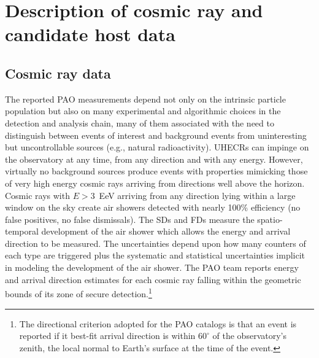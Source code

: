 \section{Description of cosmic ray and candidate host data}

\subsection{Cosmic ray data}
\label{sec:data}

The reported PAO measurements depend not only on the intrinsic particle
population but also on many experimental and algorithmic choices in the
detection and analysis chain, many of them associated with the need to
distinguish between events of interest and background events from uninteresting
but uncontrollable sources (e.g., natural radioactivity).  UHECRs can
impinge on the observatory at any time, from any direction and with any
energy.
However, virtually no background sources
produce events with properties mimicking those of very high energy cosmic rays
arriving from directions well above the horizon.
Cosmic rays with $E>3$~EeV arriving from any direction lying within a large
window on the sky create air showers detected with nearly 100\% efficiency
(no false positives, no false dismissals).  The SDs and FDs measure
the spatio-temporal development of the air shower which allows
the energy and arrival direction to be measured.  The uncertainties depend
upon how many counters of each type are triggered plus the systematic and
statistical uncertainties implicit in modeling  the development of the
air shower. The PAO team reports energy and
arrival direction estimates for each cosmic ray falling within the geometric
bounds of its zone of secure detection.\footnote{The directional criterion
adopted for the PAO catalogs is that an event is reported if it best-fit
arrival direction is within $60^\circ$ of the observatory's zenith, the
local normal to Earth's surface at the time of the event.}

